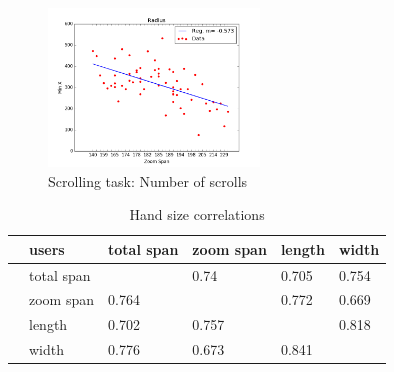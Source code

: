 \documentclass{sigchi}
\begin{document}
\begin{figure}[ht]
	\centering
  \includegraphics[width=0.5\textwidth]{figures/plotRadius.png} %
	\caption{Scrolling task: Number of scrolls}
	\label{plotScrolling}
\end{figure}


\begin{table}[]
\centering
\caption{Hand size correlations}
\label{handSizeCorrelations}
\begin{tabular}{ll|llll}
 &users  &total span  &zoom span  &length  &width  \\ \hline
 &total span  &  &0.74  &0.705  &0.754 \\
 &zoom span  &0.764  &  &0.772  &0.669 \\
 &length  &0.702  &0.757  &  &0.818 \\
 &width  &0.776  &0.673  &0.841  &
\end{tabular}
\end{table}
\end{document}
